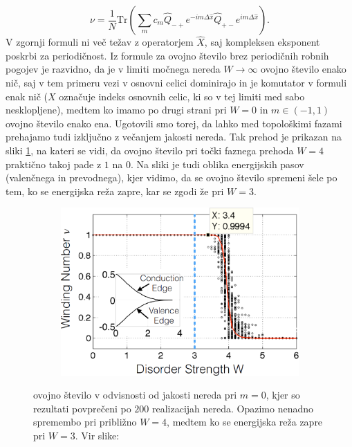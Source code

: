 \begin{equation}
\nu = \frac{1}{N} \mathrm{Tr} (\sum_m c_m \hat{Q}_{-+} e^{-im \Delta \hat{x}} \hat{Q}_{+-} e^{im \Delta \hat{x}}).
\end{equation}
V zgornji formuli ni več težav z operatorjem $\hat{X}$, saj kompleksen eksponent poskrbi za periodičnost.
Iz formule za ovojno število brez periodičnih robnih pogojev je razvidno, da je v limiti močnega nereda $W \to \infty$ ovojno število enako nič, saj v tem primeru vezi v osnovni celici dominirajo in je komutator v formuli enak nič ($X$ označuje indeks osnovnih celic, ki so v tej limiti med sabo nesklopljene), medtem ko imamo po drugi strani pri $W=0$ in $m \in (-1,1)$ ovojno število enako ena. Ugotovili smo torej, da lahko med topološkimi fazami prehajamo tudi izključno z večanjem jakosti nereda. Tak prehod je prikazan na sliki \ref{fig:InvariantVsW}, na kateri se vidi, da ovojno število pri točki faznega prehoda $W=4$ praktično takoj pade z $1$ na $0$. Na sliki je tudi oblika energijskih pasov (valenčnega in prevodnega), kjer vidimo, da se ovojno število spremeni šele po tem, ko se energijska reža zapre, kar se zgodi že pri $W=3$.
\begin{figure}[H]
\centering
\begin{subfigure}{.7\textwidth}
\includegraphics[width=\linewidth]{Figures/InvariantVsW.png}
\end{subfigure}
\caption{ovojno število v odvisnosti od jakosti nereda pri $m=0$, kjer so rezultati povprečeni po $200$ realizacijah nereda. Opazimo nenadno spremembo pri približno $W=4$, medtem ko se energijska reža zapre pri $W=3$. Vir slike: \cite{mondragon}}
\label{fig:InvariantVsW}
\end{figure}

